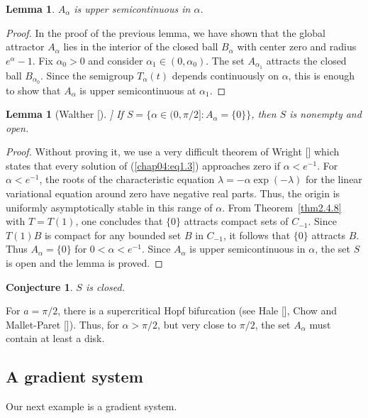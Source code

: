 \documentclass{surv-l}
\theoremstyle{plain}
\newtheorem{lemma}[theorem]{Lemma}
\newtheorem*{conj}{Conjecture}
\theoremstyle{definition}
\numberwithin{equation}{section}
\numberwithin{figure}{chapter}
\begin{document}
\begin{lemma}\label{lem4.1.4}
$A_{\alpha}$ is upper semicontinuous in $\alpha$.
\end{lemma}

\begin{proof}
In the proof of the previous lemma, we have shown that the global attractor $A_{\alpha}$ lies in the interior of the closed ball $B_{\alpha}$ with center zero and radius $e^{\alpha}-1$. Fix $\alpha_{0}>0$ and consider $\alpha_{1}\in(0,\alpha_{0})$. The set $A_{\alpha_{1}}$ attracts the closed ball $B_{{\alpha}_{0}}$. Since the semigroup $T_{\alpha}(t)$ depends continuously on $\alpha$, this is enough to show that $A_{\alpha}$ is upper semicontinuous at $\alpha_{1}$.
\end{proof}

\begin{lemma}[Walther [\citeyear{1975w}]] \label{lem4.1.5}
If $S=\{\alpha\in(0,\pi/2]\!:A_{\alpha}=\{0\}\}$, then $S$ is nonempty and open.
\end{lemma}

\begin{proof}
Without proving it, we use a very difficult theorem of Wright [\citeyear{1955w}] which states that every solution of (\ref{chap04:eq1.3}) approaches zero if $\alpha<e^{-1}$. For $\alpha <e^{-1}$, the roots of the characteristic equation $\lambda =-\alpha\exp(-\lambda)$ for the linear variational equation around zero have negative real parts. Thus, the origin is uniformly asymptotically stable in this range of $\alpha$. From Theorem~\ref{thm2.4.8} with $T=T(1)$, one concludes that $\{0\}$ attracts compact sets of $C_{-1}$. Since $T(1)B$ is compact for any bounded set $B$ in $C_{-1}$, it follows that $\{0\}$ attracts $B$. Thus $A_{\alpha}=\{0\}$ for $0<\alpha<e^{-1}$. Since $A_{\alpha}$ is upper semicontinuous in $\alpha$, the set $S$ is open and the lemma is proved.
\end{proof}

\begin{conj}
$S$ is closed.
\end{conj}
For $a=\pi/2$, there is a supercritical Hopf bifurcation (see Hale [\citeyear{1977h}], Chow and Mallet-Paret [\citeyear{1977cm}]). Thus, for $\alpha>\pi/2$, but very close to $\pi/2$, the set $A_{\alpha}$ must contain at least a disk.

\subsection{A gradient system}\label{subsec4.1.4} Our next example is a gradient system.
\end{document}

